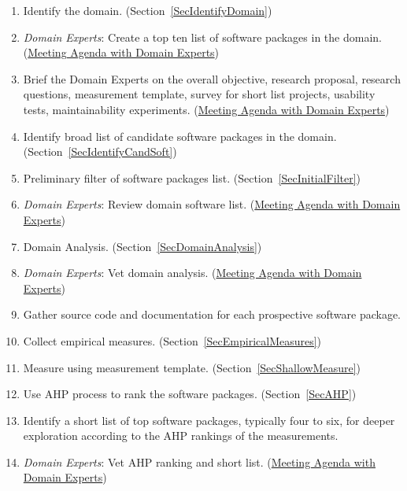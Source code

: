 \documentclass[letterpaper,cleveref]{lipics-v2019}
\theoremstyle{definition}
\begin{document}
\begin{enumerate}
\item Identify the domain. (Section~\ref{SecIdentifyDomain})
\item \emph{Domain Experts}: Create a top ten list of software packages in the
  domain. (\href{https://github.com/smiths/AIMSS/blob/master/StateOfPractice/Methodology/Meeting
    Agenda withmDomainmExperts.pdf}{Meeting Agenda with Domain Experts})
\item Brief the Domain Experts on the overall objective, research proposal,
  research questions, measurement template, survey for short list projects,
  usability tests, maintainability
  experiments. (\href{https://github.com/smiths/AIMSS/blob/master/StateOfPractice/Methodology/Meeting
    Agenda withmDomainmExperts.pdf}{Meeting Agenda with Domain Experts})
\item Identify broad list of candidate software packages in the
  domain. (Section~\ref{SecIdentifyCandSoft})
\item Preliminary filter of software packages
  list. (Section~\ref{SecInitialFilter})
\item \emph{Domain Experts}: Review domain software
  list. (\href{https://github.com/smiths/AIMSS/blob/master/StateOfPractice/Methodology/Meeting
    Agenda withmDomainmExperts.pdf}{Meeting Agenda with Domain Experts})
\item Domain Analysis. (Section~\ref{SecDomainAnalysis})
\item \emph{Domain Experts}: Vet domain
  analysis. (\href{https://github.com/smiths/AIMSS/blob/master/StateOfPractice/Methodology/Meeting
    Agenda withmDomainmExperts.pdf}{Meeting Agenda with Domain Experts})
\item Gather source code and documentation for each prospective software
  package.
\item Collect empirical measures. (Section~\ref{SecEmpiricalMeasures})
\item Measure using measurement template. (Section~\ref{SecShallowMeasure})
\item Use AHP process to rank the software packages. (Section~\ref{SecAHP})
\item Identify a short list of top software packages, typically four to six, for
  deeper exploration according to the AHP rankings of the measurements.
\item \emph{Domain Experts}: Vet AHP ranking and short
  list. (\href{https://github.com/smiths/AIMSS/blob/master/StateOfPractice/Methodology/Meeting
    Agenda withmDomainmExperts.pdf}{Meeting Agenda with Domain Experts})

\end{enumerate}
\end{document}
